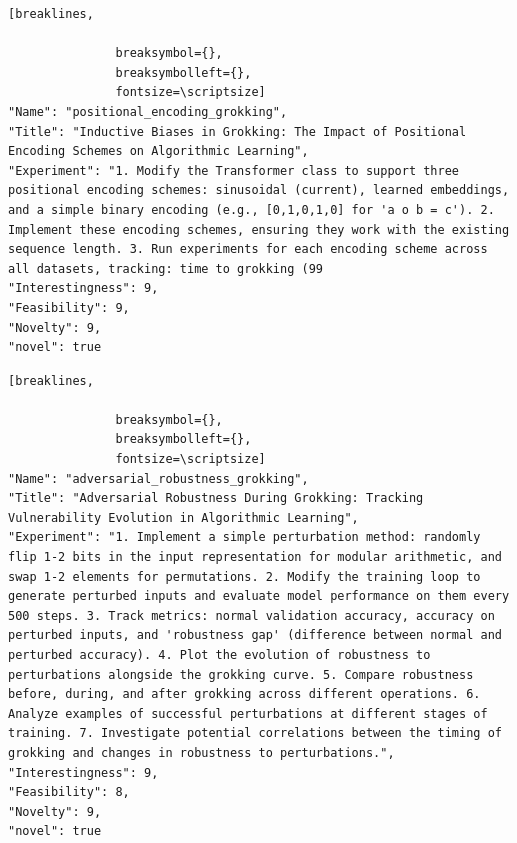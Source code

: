 \begin{tcolorbox}[
  breakable,
  colback  = blue!5!white,
  colframe = blue!75!black,
  title    = {Idea 17/50 - \texttt{positional\_encoding\_grokking}},
  fontupper=\scriptsize\ttfamily,
]
\begin{Verbatim}[breaklines,

               breaksymbol={},
               breaksymbolleft={},
               fontsize=\scriptsize]
"Name": "positional_encoding_grokking",
"Title": "Inductive Biases in Grokking: The Impact of Positional Encoding Schemes on Algorithmic Learning",
"Experiment": "1. Modify the Transformer class to support three positional encoding schemes: sinusoidal (current), learned embeddings, and a simple binary encoding (e.g., [0,1,0,1,0] for 'a o b = c'). 2. Implement these encoding schemes, ensuring they work with the existing sequence length. 3. Run experiments for each encoding scheme across all datasets, tracking: time to grokking (99
"Interestingness": 9,
"Feasibility": 9,
"Novelty": 9,
"novel": true
\end{Verbatim}
\end{tcolorbox}

\begin{tcolorbox}[
  breakable,
  colback  = blue!5!white,
  colframe = blue!75!black,
  title    = {Idea 18/50 - \texttt{adversarial\_robustness\_grokking}},
  fontupper=\scriptsize\ttfamily,
]
\begin{Verbatim}[breaklines,

               breaksymbol={},
               breaksymbolleft={},
               fontsize=\scriptsize]
"Name": "adversarial_robustness_grokking",
"Title": "Adversarial Robustness During Grokking: Tracking Vulnerability Evolution in Algorithmic Learning",
"Experiment": "1. Implement a simple perturbation method: randomly flip 1-2 bits in the input representation for modular arithmetic, and swap 1-2 elements for permutations. 2. Modify the training loop to generate perturbed inputs and evaluate model performance on them every 500 steps. 3. Track metrics: normal validation accuracy, accuracy on perturbed inputs, and 'robustness gap' (difference between normal and perturbed accuracy). 4. Plot the evolution of robustness to perturbations alongside the grokking curve. 5. Compare robustness before, during, and after grokking across different operations. 6. Analyze examples of successful perturbations at different stages of training. 7. Investigate potential correlations between the timing of grokking and changes in robustness to perturbations.",
"Interestingness": 9,
"Feasibility": 8,
"Novelty": 9,
"novel": true
\end{Verbatim}
\end{tcolorbox}

